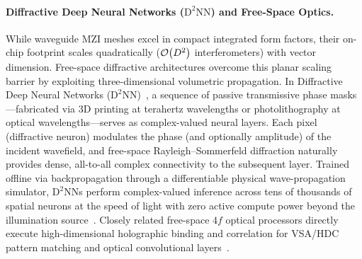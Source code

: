 \paragraph{Diffractive Deep Neural Networks ($\text{D}^2\text{NN}$) and Free-Space Optics.}
While waveguide MZI meshes excel in compact integrated form factors, their on-chip footprint scales quadratically ($\mathcal{O}\!\left(D^2\right)$ interferometers) with vector dimension.
Free-space diffractive architectures overcome this planar scaling barrier by exploiting three-dimensional volumetric propagation.
In Diffractive Deep Neural Networks ($\text{D}^2\text{NN}$)~\cite{LIN_DIFFRACTIVE_OPTICAL_NN}, a sequence of passive transmissive phase masks---fabricated via 3D printing at terahertz wavelengths or photolithography at optical wavelengths---serves as complex-valued neural layers.
Each pixel (diffractive neuron) modulates the phase (and optionally amplitude) of the incident wavefield, and free-space Rayleigh--Sommerfeld diffraction naturally provides dense, all-to-all complex connectivity to the subsequent layer.
Trained offline via backpropagation through a differentiable physical wave-propagation simulator, $\text{D}^2\text{NN}$s perform complex-valued inference across tens of thousands of spatial neurons at the speed of light with zero active compute power beyond the illumination source~\cite{LIN_DIFFRACTIVE_OPTICAL_NN}.
Closely related free-space $4f$ optical processors directly execute high-dimensional holographic binding and correlation for VSA/HDC pattern matching and optical convolutional layers~\cite{WETZSTEIN_2020_OPTICAL_AI}.

